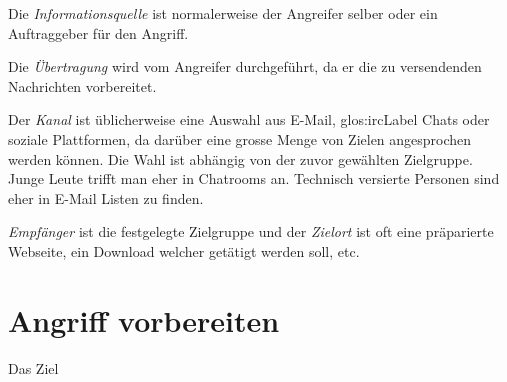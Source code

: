 Die \textit{Informationsquelle} ist normalerweise der Angreifer selber oder ein Auftraggeber für den Angriff.

Die \textit{Übertragung} wird vom Angreifer durchgeführt, da er die zu versendenden Nachrichten vorbereitet.

Der \textit{Kanal} ist üblicherweise eine Auswahl aus E-Mail,  \Gls{glos:ircLabel} Chats oder soziale Plattformen, da darüber eine grosse Menge von Zielen angesprochen werden können. Die Wahl ist abhängig von der zuvor gewählten Zielgruppe. Junge Leute trifft man eher in Chatrooms an. Technisch versierte Personen sind eher in E-Mail Listen zu finden.

\textit{Empfänger} ist die festgelegte Zielgruppe und der \textit{Zielort} ist oft eine präparierte Webseite, ein Download welcher getätigt werden soll, etc.

\section{Angriff vorbereiten}
Das Ziel 